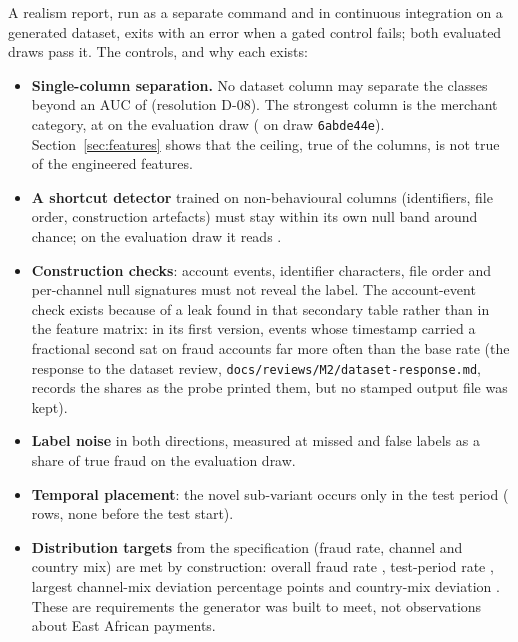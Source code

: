 A realism report, run as a separate command and in continuous integration on a generated
dataset, exits with an error when a gated control fails; both evaluated draws pass it.
The controls, and why each exists:
\begin{itemize}
  \item \textbf{Single-column separation.} No dataset column may separate the classes beyond an
        AUC of \nCeiling{} (resolution D-08). The strongest column is the merchant category, at
        \nColumnMaxAUCB{} on the evaluation draw (\nColumnMaxAUC{} on draw \texttt{6abde44e}).
        Section~\ref{sec:features} shows that the ceiling, true of the columns, is not true of the
        engineered features.
  \item \textbf{A shortcut detector} trained on non-behavioural columns (identifiers, file order,
        construction artefacts) must stay within its own null band around chance; on the
        evaluation draw it reads \nShortcutAUC{}.
  \item \textbf{Construction checks}: account events, identifier characters, file order and
        per-channel null signatures must not reveal the label. The account-event check exists
        because of a leak found in that secondary table rather than in the feature matrix: in its
        first version, events whose timestamp carried a fractional second sat on fraud accounts far
        more often than the base rate (the response to the dataset review,
        \texttt{docs/\allowbreak reviews/\allowbreak M2/\allowbreak dataset-\allowbreak response.md},
        records the shares as the probe printed them, but no stamped output file was kept).
  \item \textbf{Label noise} in both directions, measured at \nLabelNoiseMissed{} missed and
        \nLabelNoiseFalse{} false labels as a share of true fraud on the evaluation draw.
  \item \textbf{Temporal placement}: the novel sub-variant occurs only in the test period
        (\nNovelRows{} rows, none before the test start).
  \item \textbf{Distribution targets} from the specification (fraud rate, channel and country
        mix) are met by construction: overall fraud rate \nFraudRateAll{}, test-period rate
        \nFraudRateTest{}, largest channel-mix deviation \nChannelMixDev{} percentage points and
        country-mix deviation \nCountryMixDev{}. These are requirements the generator was built
        to meet, not observations about East African payments.
\end{itemize}

